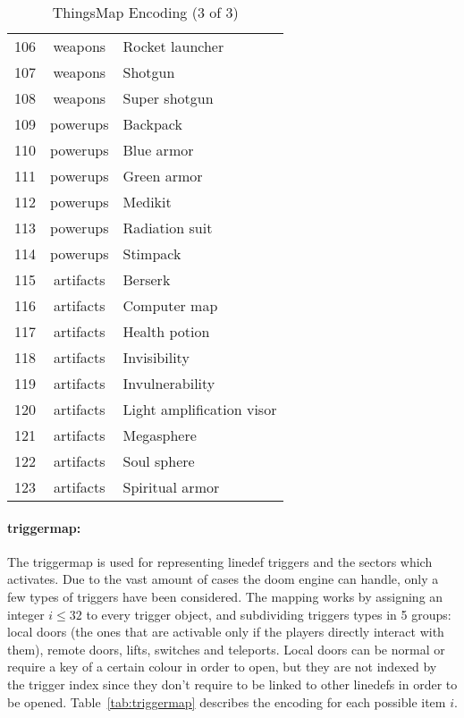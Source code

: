 \begin{table}[b]
\begin{tabularx}{\textwidth}{| c | c | X | }
		106	& weapons	& Rocket launcher \\
		107	& weapons	& Shotgun \\
		108	& weapons	& Super shotgun \\
		109	& powerups	& Backpack \\
		110	& powerups	& Blue armor \\
		111	& powerups	& Green armor \\
		112	& powerups	& Medikit \\
		113	& powerups	& Radiation suit \\
		114	& powerups	& Stimpack \\
		115	& artifacts	& Berserk \\
		116	& artifacts	& Computer map \\
		117	& artifacts	& Health potion \\
		118	& artifacts	& Invisibility \\
		119	& artifacts	& Invulnerability \\
		120	& artifacts	& Light amplification visor \\
		121	& artifacts	& Megasphere \\
		122	& artifacts	& Soul sphere \\
		123	& artifacts	& Spiritual armor  \\
		\hline
	\end{tabularx}
	\caption{ThingsMap Encoding (3 of 3)}
	\label{tab:thingsmap3}
\end{table}

\paragraph{\gls{triggermap}:} The \gls{triggermap} is used for representing linedef triggers and the sectors which activates. Due to the vast amount of cases the doom engine can handle, only a few types of triggers have been considered. The mapping works by assigning an integer $ i \le 32 $ to every trigger object, and subdividing triggers types in 5 groups: local doors (the ones that are activable only if the players directly interact with them), remote doors, lifts, switches and teleports. Local doors can be normal or require a key of a certain colour in order to open, but they are not indexed by the trigger index since they don't require to be linked to other linedefs in order to be opened. Table~\ref{tab:triggermap} describes the encoding for each possible item $ i $.

